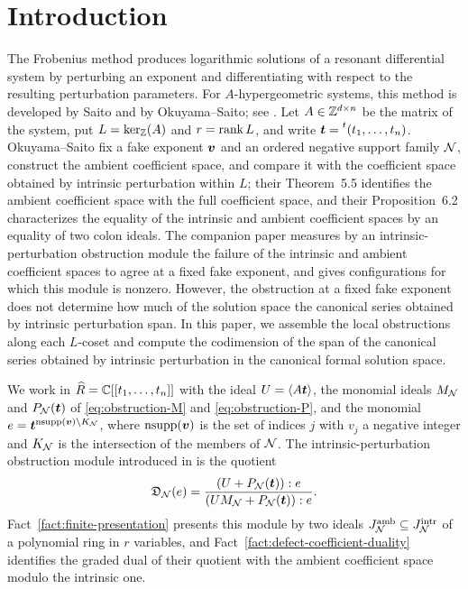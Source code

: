 \section{Introduction}

The Frobenius method produces logarithmic solutions of a resonant differential system by perturbing an exponent and differentiating with respect to the resulting perturbation parameters.
For \(A\)-hypergeometric systems, this method is developed by Saito and by Okuyama--Saito; see \cite{Sai20,OS22}.
Let \(A\in\mathbb Z^{d\times n}\) be the matrix of the system, put \(L=\ker_{\mathbb Z}(A)\) and \(r=\operatorname{rank} L\), and write \(\boldsymbol{t}=\prescript{t}{}{(t_1,\ldots,t_n)}\).
Okuyama--Saito \cite{OS25} fix a fake exponent \(\boldsymbol{v}\) and an ordered negative support family \(\mathcal N\), construct the ambient coefficient space, and compare it with the coefficient space obtained by intrinsic perturbation within \(L\); their Theorem~5.5 identifies the ambient coefficient space with the full coefficient space, and their Proposition~6.2 characterizes the equality of the intrinsic and ambient coefficient spaces by an equality of two colon ideals.
The companion paper \cite{Nak26} measures by an intrinsic-perturbation obstruction module the failure of the intrinsic and ambient coefficient spaces to agree at a fixed fake exponent, and gives configurations for which this module is nonzero.
However, the obstruction at a fixed fake exponent does not determine how much of the solution space the canonical series obtained by intrinsic perturbation span.
In this paper, we assemble the local obstructions along each \(L\)-coset and compute the codimension of the span of the canonical series obtained by intrinsic perturbation in the canonical formal solution space.

We work in \(\widehat R=\mathbb C[[t_1,\ldots,t_n]]\) with the ideal \(U=\langle A\boldsymbol{t}\rangle\), the monomial ideals \(M_{\mathcal N}\) and \(P_{\mathcal N}(\boldsymbol{t})\) of \eqref{eq:obstruction-M} and \eqref{eq:obstruction-P}, and the monomial \(e=\boldsymbol{t}^{\operatorname{nsupp}(\boldsymbol{v})\setminus K_{\mathcal N}}\), where \(\operatorname{nsupp}(\boldsymbol{v})\) is the set of indices \(j\) with \(v_j\) a negative integer and \(K_{\mathcal N}\) is the intersection of the members of \(\mathcal N\).
The intrinsic-perturbation obstruction module introduced in \cite{Nak26} is the quotient
\[
	\mathfrak D_{\mathcal N}(e)
	=\frac{(U+P_{\mathcal N}(\boldsymbol{t})):e}
	{(UM_{\mathcal N}+P_{\mathcal N}(\boldsymbol{t})):e}.
\]
Fact~\ref{fact:finite-presentation} presents this module by two ideals \(J_{\mathcal N}^{\mathrm{amb}}\subseteq J_{\mathcal N}^{\mathrm{intr}}\) of a polynomial ring in \(r\) variables, and Fact~\ref{fact:defect-coefficient-duality} identifies the graded dual of their quotient with the ambient coefficient space modulo the intrinsic one.

